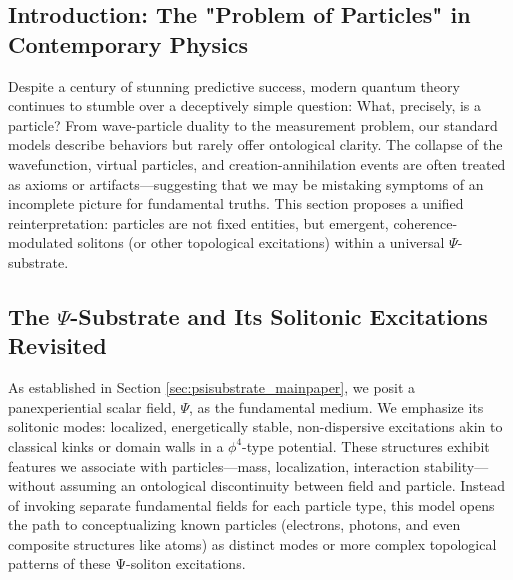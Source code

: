 \documentclass[11pt, a4paper]{book}
\begin{document}
\subsection{Introduction: The "Problem of Particles" in Contemporary Physics}
\label{ssec:particles_intro_mainpaper}
Despite a century of stunning predictive success, modern quantum theory continues to stumble over a deceptively simple question: What, precisely, is a particle? From wave-particle duality to the measurement problem, our standard models describe behaviors but rarely offer ontological clarity. The collapse of the wavefunction, virtual particles, and creation-annihilation events are often treated as axioms or artifacts—suggesting that we may be mistaking symptoms of an incomplete picture for fundamental truths. This section proposes a unified reinterpretation: particles are not fixed entities, but emergent, coherence-modulated solitons (or other topological excitations) within a universal $\Psi$-substrate.

\subsection{The $\Psi$-Substrate and Its Solitonic Excitations Revisited}
\label{ssec:particles_psisolitons_mainpaper}
As established in Section \ref{sec:psisubstrate_mainpaper}, we posit a panexperiential scalar field, $\Psi$, as the fundamental medium. We emphasize its solitonic modes: localized, energetically stable, non-dispersive excitations akin to classical kinks or domain walls in a $\phi^4$-type potential. These structures exhibit features we associate with particles—mass, localization, interaction stability—without assuming an ontological discontinuity between field and particle. Instead of invoking separate fundamental fields for each particle type, this model opens the path to conceptualizing known particles (electrons, photons, and even composite structures like atoms) as distinct modes or more complex topological patterns of these Ψ-soliton excitations.
\end{document}
